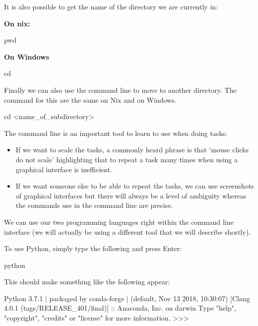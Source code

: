 It is also possible to get the name of the directory we are currently in:

\textbf{On nix:}

\begin{cliin}
pwd
\end{cliin}

\textbf{On Windows}

\begin{cliin}
cd
\end{cliin}

Finally we can also use the command line to move to another directory. The
command for this are the same on Nix and on Windows.

\begin{cliin}
cd <name_of_subdirectory>
\end{cliin}


The command line is an important tool to learn to use when doing tasks:

\begin{itemize}
    \item If we want to scale the tasks, a commonly heard phrase is that `mouse
        clicks do not scale' highlighting that to repeat a task many times when
        using a graphical interface is inefficient.
    \item If we want someone else to be able to repeat the tasks, we can use
        screenshots of graphical interfaces but there will always be a level of
        ambiguity whereas the commands use in the command line are precise.
\end{itemize}

We can use our two programming languages right within the command line interface
(we will actually be using a different tool that we will describe shortly).

To use Python, simply type the following and press Enter:

\begin{cliin}
python
\end{cliin}

This should make something like the following appear:

\begin{cliout}
Python 3.7.1 | packaged by conda-forge | (default, Nov 13 2018, 10:30:07)
[Clang 4.0.1 (tags/RELEASE_401/final)] :: Anaconda, Inc. on darwin
Type "help", "copyright", "credits" or "license" for more information.
>>>
\end{cliout}

